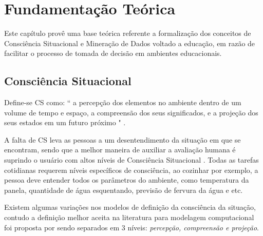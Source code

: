 \documentclass[12pt]{article}
\begin{document}
\section{Fundamentação Teórica} \label{sec:firstpage}
	
Este capítulo provê uma base teórica referente a formalização dos conceitos de Consciência Situacional e Mineração de Dados voltado a educação, em razão de facilitar o processo de tomada de decisão em ambientes educacionais.  

\subsection{Consciência Situacional}

Define-se CS como: `` a percepção dos elementos no ambiente dentro de um volume de tempo e espaço, a compreensão dos seus significados, e a projeção dos seus estados em um futuro próximo " \cite [p. 97]{Endsley1988}.

A falta de CS leva as pessoas a um desentendimento da situação em que se encontram, sendo que a melhor maneira de auxiliar a avaliação humana é suprindo o usuário com altos níveis de Consciência Situacional \cite{Endsley2012}. Todas as tarefas cotidianas requerem níveis específicos de consciência, ao cozinhar por exemplo, a pessoa deve entender todos os parâmetros do ambiente, como temperatura da panela, quantidade de água esquentando, previsão de fervura da água e etc.

Existem algumas variações nos modelos de definição da consciência da situação, contudo a definição melhor aceita na literatura para modelagem computacional foi proposta por \cite{Endsley1995} sendo separados em 3 níveis: \emph{percepção, compreensão e projeção}.
\end{document}
